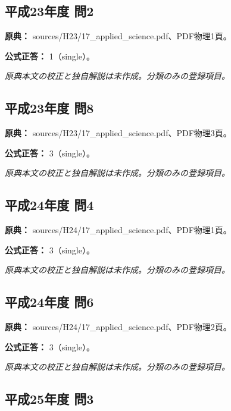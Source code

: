 \subsection{平成23年度 問2}
\label{q:h23-reg-applied-02}

\noindent\textbf{原典：} sources/H23/17\_applied\_science.pdf、PDF物理1頁。

\textbf{公式正答：} 1（single）。

\par\textit{原典本文の校正と独自解説は未作成。分類のみの登録項目。}

\subsection{平成23年度 問8}
\label{q:h23-reg-applied-08}

\noindent\textbf{原典：} sources/H23/17\_applied\_science.pdf、PDF物理3頁。

\textbf{公式正答：} 3（single）。

\par\textit{原典本文の校正と独自解説は未作成。分類のみの登録項目。}

\subsection{平成24年度 問4}
\label{q:h24-reg-applied-04}

\noindent\textbf{原典：} sources/H24/17\_applied\_science.pdf、PDF物理1頁。

\textbf{公式正答：} 3（single）。

\par\textit{原典本文の校正と独自解説は未作成。分類のみの登録項目。}

\subsection{平成24年度 問6}
\label{q:h24-reg-applied-06}

\noindent\textbf{原典：} sources/H24/17\_applied\_science.pdf、PDF物理2頁。

\textbf{公式正答：} 3（single）。

\par\textit{原典本文の校正と独自解説は未作成。分類のみの登録項目。}

\subsection{平成25年度 問3}
\label{q:h25-reg-applied-03}

